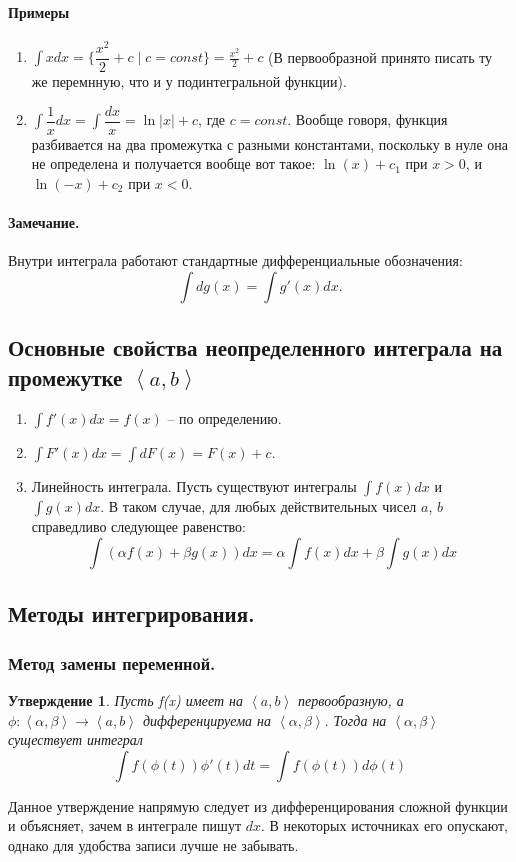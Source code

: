 \documentclass{article}
\theoremstyle{plain}
\newtheorem{claim}{Утверждение}
\theoremstyle{definition}
\theoremstyle{remark}
\renewcommand{\*}{\cdot}
\begin{document}
\paragraph{Примеры}
\begin{enumerate}
\item $\displaystyle \int xdx = \Big\{\dfrac{x^2}{2} + c \;| \;c = const\Big\} = \frac{x^2}{2} + c$ (В первообразной принято писать ту же перемнную, что и у подинтегральной функции).
\item $\displaystyle \int \dfrac{1}{x}dx = \int\dfrac{dx}{x} = \ln|x| + c$, где $c=const$. Вообще говоря, функция разбивается на два промежутка с разными константами, поскольку в нуле она не определена и получается вообще вот такое: $\ln(x) + c_1$ при $x > 0$, и $\ln(-x) + c_2$ при $x < 0$.
\end{enumerate}
\paragraph{Замечание.} Внутри интеграла работают стандартные дифференциальные обозначения: \[\int dg(x) = \int g'(x)dx.\]
\subsection{Основные свойства неопределенного интеграла на промежутке $\left<a, b\right>$}
\begin{enumerate}

\item$\int f'(x)dx = f(x)$ -- по определению.\\
\item $\int F'(x)dx = \int dF(x) = F(x) + c.$\\
\item {Линейность интеграла.} Пусть существуют интегралы $\int f(x)dx$ и $\int g(x)dx$. В таком случае, для любых действительных чисел $a$, $b$ справедливо следующее равенство: \[ \int (\alpha f(x) + \beta g(x))dx = \alpha \int f(x)dx + \beta \int g(x)dx\]
\end{enumerate}
\subsection{Методы интегрирования.}
\subsubsection*{Метод замены переменной.}
\begin{claim}
Пусть f(x) имеет на $\left<a, b\right>$ первообразную, а $\phi : \left<\alpha, \beta\right> \rightarrow \left<a, b\right>$ дифференцируема на $\left<\alpha, \beta\right>.$ Тогда на $\left<\alpha, \beta\right>$ существует интеграл \[\int f(\phi(t))\phi'(t)dt = \int f(\phi(t))d\phi(t)\] 
\end{claim}
Данное утверждение напрямую следует из дифференцирования сложной функции и объясняет, зачем в интеграле пишут $dx$. В некоторых источниках его опускают, однако для удобства записи лучше не забывать.
\end{document}
